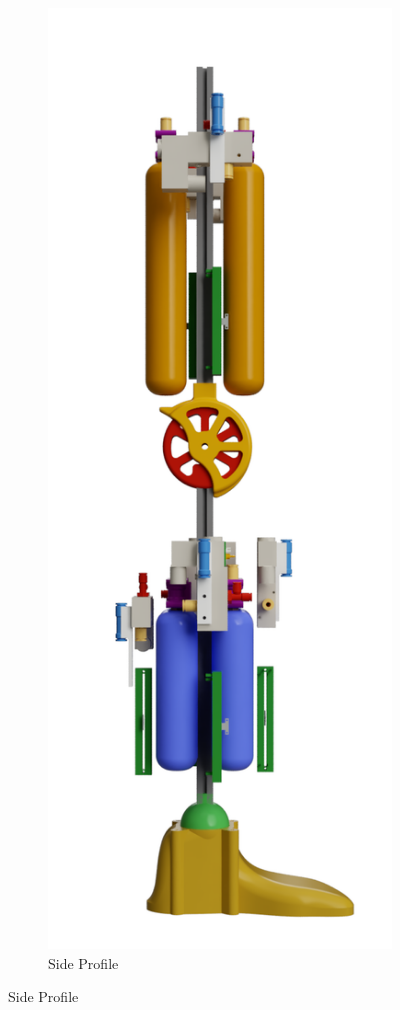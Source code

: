 \documentclass[11pt,a4paper]{article}
\begin{document}
\begin{figure}[hbt!]
    \centering
    \begin{subfigure}[t]{0.4 \textwidth}
        \centering
        \caption{Side Profile}
        \includegraphics[scale=0.2]{Leg_Render_Side_2.PNG}

\end{subfigure}
\end{figure}
\end{document}

